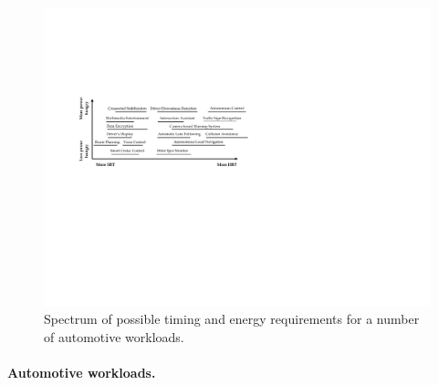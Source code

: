 
\begin{figure}[h]
\centering 
\includegraphics[width=4.6in]{images/automotive.pdf}
\vspace{-2mm}\caption{Spectrum of possible timing and energy requirements for a number of automotive workloads.}
\vspace{-4mm}
\label{fig:automotive}
\end{figure}

\paragraph{Automotive workloads.} 
\label{sec:automotiveworkload}


